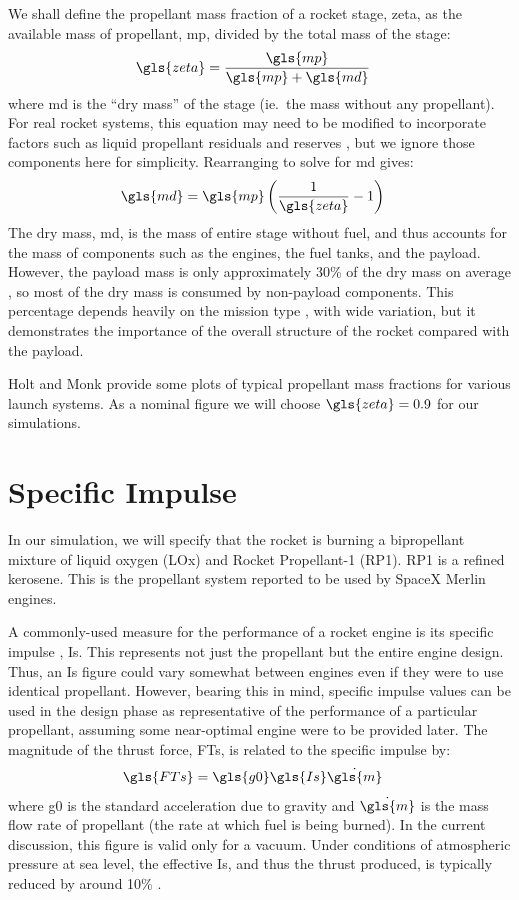 \documentclass[12pt,openany]{book}
\begin{document}
We shall define the propellant mass fraction of a rocket stage, \gls{zeta}, as the available mass of propellant, \gls{mp}, divided by the total mass of the stage:
\begin{align}
  \gls{zeta} &= \frac{\gls{mp}}{\gls{mp} + \gls{md}}
\end{align}
where \gls{md} is the ``dry mass'' of the stage (ie.\ the mass without any propellant). For real rocket systems, this equation may need to be modified to incorporate factors such as liquid propellant residuals and reserves \cite{holt2009}, but we ignore those components here for simplicity. Rearranging to solve for \gls{md} gives:
\begin{align}
  \gls{md} &= \gls{mp} \left(\frac{1}{\gls{zeta}} - 1\right)
\end{align}
The dry mass, \gls{md}, is the mass of entire stage without fuel, and thus accounts for the mass of components such as the engines, the fuel tanks, and the payload. However, the payload mass is only approximately 30\% of the dry mass on average \cite{springmann2004}, so most of the dry mass is consumed by non-payload components. This percentage depends heavily on the mission type \cite{gerberich2013}, with wide variation, but it demonstrates the importance of the overall structure of the rocket compared with the payload.

Holt and Monk \cite{holt2009} provide some plots of typical propellant mass fractions for various launch systems. As a nominal figure we will choose \(\gls{zeta}=0.9\) for our simulations.

\section{Specific Impulse}

In our simulation, we will specify that the rocket is burning a bipropellant mixture of liquid oxygen (LOx) and Rocket Propellant-1 (RP1). RP1 is a refined kerosene. This is the propellant system reported to be used by SpaceX Merlin engines.

A commonly-used measure for the performance of a rocket engine is its specific impulse \cite{huzel1967}, \gls{Is}. This represents not just the propellant but the entire engine design. Thus, an \gls{Is} figure could vary somewhat between engines even if they were to use identical propellant. However, bearing this in mind, specific impulse values can be used in the design phase as representative of the performance of a particular propellant, assuming some near-optimal engine were to be provided later. The magnitude of the thrust force, \gls{FTs}, is related to the specific impulse by:
\begin{align}
  \gls{FTs} &= \gls{g0} \gls{Is} \dot{\gls{m}}
  \label{eq:fts-specific-impulse}
\end{align}
where \gls{g0} is the standard acceleration due to gravity and \(\dot{\gls{m}}\) is the mass flow rate of propellant (the rate at which fuel is being burned). In the current discussion, this figure is valid only for a vacuum. Under conditions of atmospheric pressure at sea level, the effective \gls{Is}, and thus the thrust produced, is typically reduced by around 10\% \cite{kephart1971}.
\end{document}
